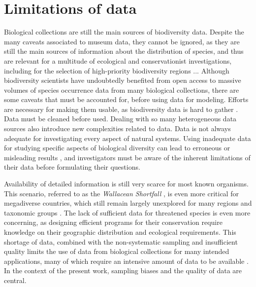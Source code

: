 \section{Limitations of data} %


Biological collections are still the main sources of biodiversity data.
Despite the many caveats associated to museum data, they cannot be ignored, as they are still the main sources of information about the distribution of species, and thus are relevant for a multitude of ecological and conservationist investigations, including for the selection of high-priority biodiversity regions \cite{Funk2002}... 
Although biodiversity scientists have undoubtedly benefited from open access to massive volumes of species occurrence data from many biological collections, there are some caveats that must be accounted for, before using data for modeling.
Efforts are necessary for making them usable, as biodiversity data is hard to gather \cite{}.
Data must be cleaned before used.
Dealing with so many heterogeneous data sources also introduce new complexities related to data.
Data is not always adequate for investigating every aspect of natural systems.
Using inadequate data for studying specific aspects of biological diversity can lead to erroneous or misleading results \cite{Chapman2005}, and investigators must be aware of the inherent limitations of their data before formulating their questions. %

Availability of detailed information is still very scarce for most known organisms.
This scenario, referred to as the \textit{Wallacean Shortfall} \cite{Lomolino2004}, is even more critical for megadiverse countries, which still remain largely unexplored for many regions and taxonomic groups \cite{Soberon2004}.
The lack of sufficient data for threatened species is even more concerning, as designing efficient programs for their conservation require knowledge on their geographic distribution and ecological requirements.
This shortage of data, combined with the non-systematic sampling and insufficient quality limits the use of data from biological collections for many intended applications, many of which require an intensive amount of data to be available \cite{Guisan2007}.
In the context of the present work, sampling biases and the quality of data are central.


